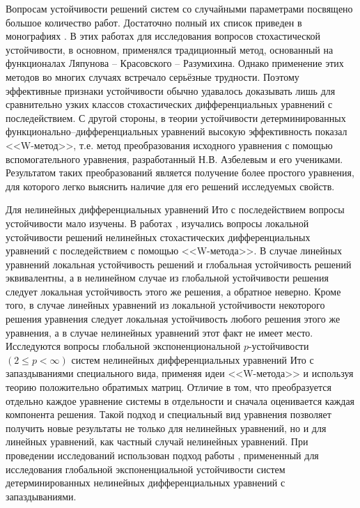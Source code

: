 Вопросам устойчивости решений систем со случайными параметрами
посвящено большое количество работ. Достаточно полный их список
приведен в монографиях \cite{kad1,kad2,kad3,kad4}. В этих работах для исследования
вопросов стохастической устойчивости, в основном, применялся
традиционный метод, основанный на функционалах
Ляпунова -- Красовского -- Разумихина. Однако применение этих методов во
многих случаях встречало серьёзные трудности. Поэтому эффективные
признаки устойчивости обычно удавалось доказывать лишь для
сравнительно узких классов стохастических дифференциальных уравнений
с последействием. С другой стороны, в теории устойчивости
детерминированных функционально--дифференциальных уравнений высокую
эффективность показал <<W-метод>>, т.е. метод преобразования
исходного уравнения с помощью вспомогательного уравнения,
разработанный Н.В. Азбелевым и его учениками. Результатом таких
преобразований является получение более простого уравнения, для
которого легко выяснить наличие для его решений исследуемых свойств.

Для нелинейных дифференциальных уравнений Ито с последействием
вопросы устойчивости мало изучены. В работах \cite{kad5}, \cite{kad6} изучались
вопросы локальной устойчивости решений нелинейных стохастических
дифференциальных уравнений с последействием с помощью <<W-метода>>. В
случае линейных уравнений локальная устойчивость решений и
глобальная устойчивость решений эквивалентны, а в нелинейном случае
из глобальной устойчивости решения следует локальная устойчивость
этого же решения, а обратное неверно. Кроме того, в случае линейных
уравнений из локальной устойчивости некоторого решения уравнения
следует локальная устойчивость любого решения этого же уравнения, а в
случае нелинейных уравнений этот факт не имеет место.
Исследуются вопросы  глобальной
экспоненциональной $p$-устойчи\-вос\-ти $(2 \le p < \infty )$ систем
нелинейных дифференциальных уравнений Ито с запаздываниями
специального вида, применяя идеи <<W-метода>> и  используя теорию
положительно обратимых матриц. Отличие в том, что преобразуется
отдельно каждое уравнение системы в отдельности и сначала
оценивается каждая компонента решения. Такой подход и специальный
вид уравнения позволяет получить новые результаты не только для
нелинейных уравнений, но и для линейных уравнений, как частный
случай нелинейных уравнений. При проведении исследований использован
подход работы \cite{kad7}, примененный для исследования глобальной
экспоненциальной устойчивости систем детерминированных нелинейных
дифференциальных уравнений с запаздываниями.



